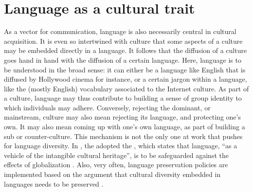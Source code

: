 \documentclass[../thesis.tex]{subfiles}
\begin{document}


\section{Language as a cultural trait}
As a vector for communication, language is also necessarily central in cultural
acquisition. It is even so intertwined with culture that some aspects of a culture may
be embedded directly in a language. It follows that the diffusion of a culture goes hand
in hand with the diffusion of a certain language. Here, language is to be understood in
the broad sense: it can either be a language like English that is diffused by Hollywood
cinema for instance, or a certain jargon within a language, like the (mostly English)
vocabulary associated to the Internet culture. As part of a culture, language may thus
contribute to building a sense of group identity to which individuals may adhere.
Conversely, rejecting the dominant, or mainstream, culture may also mean rejecting its
language, and protecting one's own. It may also mean coming up with one's own language,
as part of building a sub or counter-culture. This mechanism is not the only one at work
that pushes for language diversity. In \citeyear{UNESCOConventionSafeguarding2003}, the
\citeauthor{UNESCOConventionSafeguarding2003} adopted the
, which states that language, ``as a vehicle
of the intangible cultural heritage'', is to be safeguarded against the effects of
globalization \cite{UNESCOConventionSafeguarding2003}. Also, very often, language
preservation policies are implemented based on the argument that cultural diversity
embedded in languages needs to be preserved
\cite{CrystalLanguageDeath2000,GrenobleEndangeredLanguages1998,KraussWorldLanguages1992}.



\end{document}
